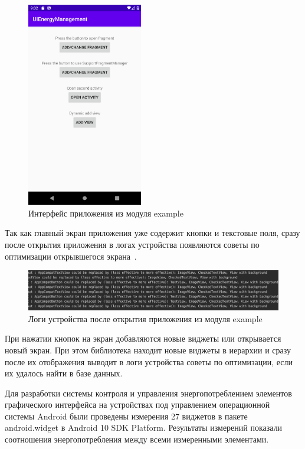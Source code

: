 \documentclass[a4paper,14pt]{extarticle} %
\begin{document}
	\begin{figure}[htb]
		\centering
		\includegraphics[width=0.45\textwidth]{example}
		\caption{Интерфейс приложения из модуля example}
		\label{fig:example}
	\end{figure}
	
	Так как главный экран приложения уже содержит кнопки и текстовые поля, сразу после открытия приложения в логах устройства появляются советы по оптимизации открывшегося экрана~\ris{\ref{fig:example_log}}.
	
	\begin{figure}[htb]
		\includegraphics[width=\textwidth]{example_log}
		\caption{Логи устройства после открытия приложения из модуля example}
		\label{fig:example_log}
	\end{figure}

	При нажатии кнопок на экран добавляются новые виджеты или открывается новый экран. При этом библиотека находит новые виджеты в иерархии и сразу после их отображения выводит в логи устройства советы по оптимизации, если их удалось найти в базе данных.
	
	\newpage
	
	Для разработки системы контроля и управления энергопотреблением элементов графического интерфейса на устройствах под управлением операционной системы Android были проведены измерения 27 виджетов в пакете android.widget в Android 10 SDK Platform. Результаты измерений показали соотношения энергопотребления между всеми измеренными элементами.
	
\end{document}
